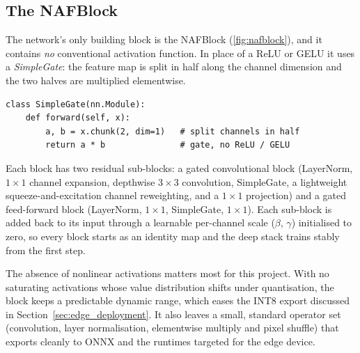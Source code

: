 \subsection{The NAFBlock}
\label{sec:nafnet_block_structure}

The network's only building block is the NAFBlock (\autoref{fig:nafblock}), and it contains \emph{no} conventional activation function. In place of a ReLU or GELU it uses a \emph{SimpleGate}: the feature map is split in half along the channel dimension and the two halves are multiplied elementwise.

\begin{lstlisting}[caption={The SimpleGate used in place of a nonlinear activation: the channels are split in half and multiplied elementwise.}, label={lst:simplegate}]
class SimpleGate(nn.Module):
    def forward(self, x):
        a, b = x.chunk(2, dim=1)   # split channels in half
        return a * b               # gate, no ReLU / GELU
\end{lstlisting}

Each block has two residual sub-blocks: a gated convolutional block (LayerNorm, $1{\times}1$ channel expansion, depthwise $3{\times}3$ convolution, SimpleGate, a lightweight squeeze-and-excitation channel reweighting, and a $1{\times}1$ projection) and a gated feed-forward block (LayerNorm, $1{\times}1$, SimpleGate, $1{\times}1$). Each sub-block is added back to its input through a learnable per-channel scale ($\beta$, $\gamma$) initialised to zero, so every block starts as an identity map and the deep stack trains stably from the first step.

The absence of nonlinear activations matters most for this project. With no saturating activations whose value distribution shifts under quantisation, the block keeps a predictable dynamic range, which eases the INT8 export discussed in Section~\ref{sec:edge_deployment}. It also leaves a small, standard operator set (convolution, layer normalisation, elementwise multiply and pixel shuffle) that exports cleanly to ONNX and the runtimes targeted for the edge device.

